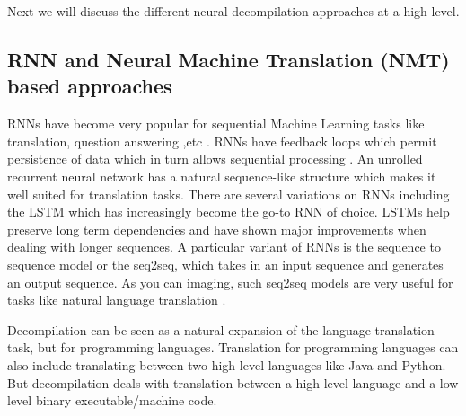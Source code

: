 \documentclass{article}
\begin{document}
Next we will discuss the different neural decompilation approaches at a high level.

\subsection{RNN and Neural Machine Translation (NMT) based approaches}
RNNs have become very popular for sequential Machine Learning tasks like translation, question answering ,etc \cite{sutskever2014sequence}. RNNs have feedback loops which permit persistence of data which in turn allows sequential processing \cite{siegelmann1993foundations}. An unrolled recurrent neural network has a natural sequence-like structure which makes it well suited for translation tasks. There are several variations on RNNs including the LSTM \cite{hochreiter1997long} which has increasingly become the go-to RNN of choice. LSTMs help preserve long term dependencies and have shown major improvements when dealing with longer sequences. A particular variant of RNNs is the sequence to sequence model or the seq2seq, which takes in an input sequence and generates an output sequence. As you can imaging, such seq2seq models are very useful for tasks like natural language translation \cite{cho2014learning}.

Decompilation can be seen as a natural expansion of the language translation task, but for programming languages. Translation for programming languages can also include translating between two high level languages like Java and Python. But decompilation deals with translation between a high level language and a low level binary executable/machine code. 
\end{document}
